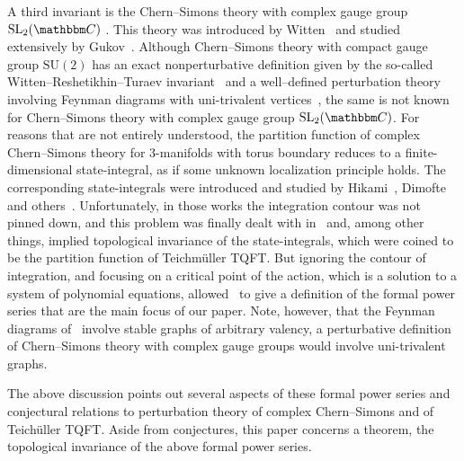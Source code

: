 \documentclass[12pt,reqno]{amsart}
\theoremstyle{definition}
\def\BC{\mathbbm C}
\def\SL{\mathrm{SL}}
\renewcommand{\=}{\;=\;}
\begin{document}
A third invariant is the Chern--Simons theory with complex gauge group $\SL_2(\BC)$ .
This theory was introduced by Witten~\cite{Witten:complexCS} and studied
extensively by Gukov~\cite{Gukov:Apoly}. Although Chern--Simons theory with compact
gauge group $\mathrm{SU}(2)$ has an exact nonperturbative definition given by the
so-called Witten--Reshetikhin--Turaev invariant~\cite{Witten:Jones,RT} and a
well--defined perturbation theory involving Feynman diagrams with uni-trivalent
vertices~\cite{AS,AarhusII}, the same is not known for Chern--Simons theory with
complex gauge group $\SL_2(\BC)$. For reasons that are not entirely
understood, the partition function of complex Chern--Simons theory for 3-manifolds
with torus boundary reduces to a finite-dimensional state-integral, as if some
unknown localization principle holds. The corresponding state-integrals were
introduced and studied by Hikami~\cite{Hikami}, Dimofte~\cite{Dimofte:complexCS}
and others~\cite{DGLZ}. Unfortunately, in those works the integration contour
was not pinned down, and this problem was finally dealt with in~\cite{AK}
and, among other things, implied topological invariance of the state-integrals,
which were coined to be the partition function of Teichm\"uller TQFT.
But ignoring the contour of integration, and focusing on a critical point of the
action, which is a solution to a system of polynomial equations, allowed~\cite{DG}
to give a definition of the formal power series that are the main focus of our paper.  
Note, however, that the Feynman diagrams of~\cite{DG} involve stable graphs of
arbitrary valency, a perturbative definition of Chern--Simons theory with complex
gauge groups would involve uni-trivalent graphs. 

The above discussion points out several aspects of these formal power series
and conjectural relations to perturbation theory of complex Chern--Simons
and of Teich\"uller TQFT. Aside from conjectures, this paper concerns
a theorem, the topological invariance of the above formal power series.
  
\end{document}
